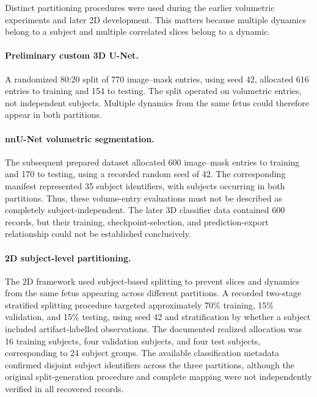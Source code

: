 Distinct partitioning procedures were used during the earlier volumetric experiments and later 2D development. This matters because multiple dynamics belong to a subject and multiple correlated slices belong to a dynamic.

\paragraph{Preliminary custom 3D U-Net.}
A randomized 80:20 split of 770 image--mask entries, using seed 42, allocated 616 entries to training and 154 to testing. The split operated on volumetric entries, not independent subjects. Multiple dynamics from the same fetus could therefore appear in both partitions.

\paragraph{nnU-Net volumetric segmentation.}
The subsequent prepared dataset allocated 600 image--mask entries to training and 170 to testing, using a recorded random seed of 42. The corresponding manifest represented 35 subject identifiers, with subjects occurring in both partitions. Thus, these volume-entry evaluations must not be described as completely subject-independent. The later 3D classifier data contained 600 records, but their training, checkpoint-selection, and prediction-export relationship could not be established conclusively.

\paragraph{2D subject-level partitioning.}
The 2D framework used subject-based splitting to prevent slices and dynamics from the same fetus appearing across different partitions. A recorded two-stage stratified splitting procedure targeted approximately 70\% training, 15\% validation, and 15\% testing, using seed 42 and stratification by whether a subject included artifact-labelled observations. The documented realized allocation was 16 training subjects, four validation subjects, and four test subjects, corresponding to 24 subject groups. The available classification metadata confirmed disjoint subject identifiers across the three partitions, although the original split-generation procedure and complete mapping were not independently verified in all recovered records.

